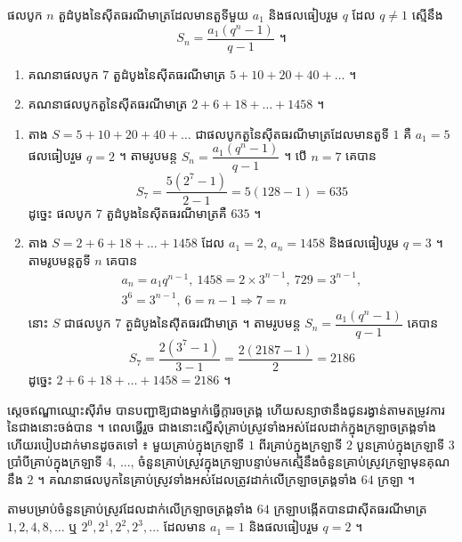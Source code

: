 \begin{formulaBox}[ជាទូទៅ]
ផលបូក $n$ តួដំបូងនៃស៊ីតធរណីមាត្រដែលមានតួទីមួយ $a_1$ និងផលធៀបរួម $q$ ដែល $q \ne 1$ ស្មើនឹង
\[ S_n = \frac{a_1(q^n - 1)}{q - 1} \text{ ។} \]
\end{formulaBox}

\begin{example}[លំហាត់គំរូ ១]
\begin{enumerate}[a]
  \item គណនាផលបូក $7$ តួដំបូងនៃស៊ីតធរណីមាត្រ $5 + 10 + 20 + 40 + \ldots$ ។
  \item គណនាផលបូកតួនៃស៊ីតធរណីមាត្រ $2 + 6 + 18 + \ldots + 1458$ ។
\end{enumerate}
\end{example}
\ans
\begin{enumerate}[a]
  \item តាង $S = 5 + 10 + 20 + 40 + \ldots$ ជាផលបូកតួនៃស៊ីតធរណីមាត្រដែលមានតួទី $1$ គឺ $a_1 = 5$ ផលធៀបរួម $q = 2$ ។ តាមរូបមន្ត $S_n = \dfrac{a_1(q^n - 1)}{q - 1}$ ។ បើ $n = 7$ គេបាន
  \[ S_7 = \frac{5(2^7 - 1)}{2 - 1} = 5(128 - 1) = 635 \]
  ដូច្នេះ ផលបូក $7$ តួដំបូងនៃស៊ីតធរណីមាត្រគឺ $635$ ។
  \item តាង $S = 2 + 6 + 18 + \ldots + 1458$ ដែល $a_1 = 2$, $a_n = 1458$ និងផលធៀបរួម $q = 3$ ។ តាមរូបមន្តតួទី $n$ គេបាន
  \[ \begin{gathered} a_n = a_1 q^{n-1},\ 1458 = 2 \times 3^{n-1},\ 729 = 3^{n-1},\\ 3^6 = 3^{n-1},\ 6 = n - 1 \Rightarrow 7 = n \end{gathered} \]
  នោះ $S$ ជាផលបូក $7$ តួដំបូងនៃស៊ីតធរណីមាត្រ ។ តាមរូបមន្ត $S_n = \dfrac{a_1(q^n - 1)}{q - 1}$ គេបាន
  \[ S_7 = \frac{2(3^7 - 1)}{3 - 1} = \frac{2(2187 - 1)}{2} = 2186 \]
  ដូច្នេះ $2 + 6 + 18 + \ldots + 1458 = 2186$ ។
\end{enumerate}

\begin{example}[លំហាត់គំរូ ២]
ស្តេចឥណ្ឌាឈ្មោះស៊ីរ៉ាម បានបញ្ជាឱ្យជាងម្នាក់ធ្វើក្តារចត្រង្គ ហើយសន្យាថានឹងជូនរង្វាន់តាមតម្រូវការនៃជាងនោះចង់បាន ។ ពេលធ្វើរួច ជាងនោះស្នើសុំគ្រាប់ស្រូវទាំងអស់ដែលដាក់ក្នុងក្រឡាចត្រង្គទាំង ហើយរបៀបដាក់មានដូចតទៅ ៖ មួយគ្រាប់ក្នុងក្រឡាទី $1$ ពីរគ្រាប់ក្នុងក្រឡាទី $2$ បួនគ្រាប់ក្នុងក្រឡាទី $3$ ប្រាំបីគ្រាប់ក្នុងក្រឡាទី $4$, $\ldots$, ចំនួនគ្រាប់ស្រូវក្នុងក្រឡាបន្ទាប់មកស្មើនឹងចំនួនគ្រាប់ស្រូវក្រឡាមុនគុណនឹង $2$ ។ គណនាផលបូកនៃគ្រាប់ស្រូវទាំងអស់ដែលត្រូវដាក់លើក្រឡាចត្រង្គទាំង $64$ ក្រឡា ។
\end{example}
\ans
តាមបម្រាប់ចំនួនគ្រាប់ស្រូវដែលដាក់លើក្រឡាចត្រង្គទាំង $64$ ក្រឡាបង្កើតបានជាស៊ីតធរណីមាត្រ $1, 2, 4, 8, \ldots$ ឬ $2^0, 2^1, 2^2, 2^3, \ldots$ ដែលមាន $a_1 = 1$ និងផលធៀបរួម $q = 2$ ។

